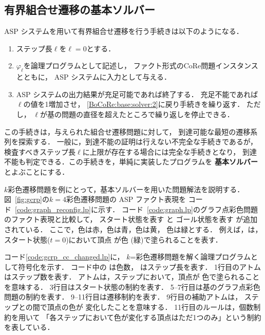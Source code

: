 \subsection{有界組合せ遷移の基本ソルバー} \label{sec:based_solver}

ASP システムを用いて有界組合せ遷移を行う手続きは以下のようになる．
\begin{enumerate}
\item ステップ長$\ell$を$\ell=0$とする．
\item \label{BoCoRe:base:solver:2}
  $\varphi_\ell$を論理プログラムとして記述し，
  ファクト形式のCoRe問題インスタンスとともに，
  ASP システムに入力として与える．
\item ASP システムの出力結果が充足可能であれば終了する．
  充足不能であれば$\ell$の値を1増加させ，
  \ref{BoCoRe:base:solver:2}に戻り手続きを繰り返す．
  ただし，
  $\ell$が基の問題の直径を超えたところで繰り返しを停止できる．
\end{enumerate}
この手続きは，与えられた組合せ遷移問題に対して，
到達可能な最短の遷移系列を探索する．
一般に，到達不能の証明は行えない不完全な手続きであるが，
検査すべきステップ長$\ell$に上限が存在する場合には完全な手続きとなり，
到達不能も判定できる．この手続きを，単純に実装したプログラムを
\textbf{基本ソルバー}とよぶことにする．



$k$彩色遷移問題を例にとって，基本ソルバーを用いた問題解法を説明する．
図~\ref{fig:gcrp}の$k=4$彩色遷移問題の ASP ファクト表現を
コード~\ref{code:graph_reconfig.lp}に示す．
コード~\ref{code:graph.lp}のグラフ点彩色問題のファクト表現と比較して，
スタート状態を表す
と
ゴール状態を表す
が追加されている．
ここで，色は赤，色は青，色は黄，
色は緑とする．
例えば，は，スタート状態($t=0$)において頂点
が色 (緑)で塗られることを表す．

コード\ref{code:gcrp_cc_changed.lp}に，
$k$=彩色遷移問題を解く論理プログラムとして符号化を示す．
コード中の は色数， はステップ長を表す．
1行目のアトムはステップ数を表す．
アトムは，ステップにおいて，頂点が
色で塗られることを意味する．
3行目はスタート状態の制約を表す．
5--7行目は基のグラフ点彩色問題の制約を表す．
9--11行目は遷移制約を表す．
9行目の補助アトムは，
ステップとの間で頂点の色が
変化したことを意味する．
11行目のルールは，個数制約を用いて
「各ステップにおいて色が変化する頂点はただ1つのみ」という制約
を表している．

